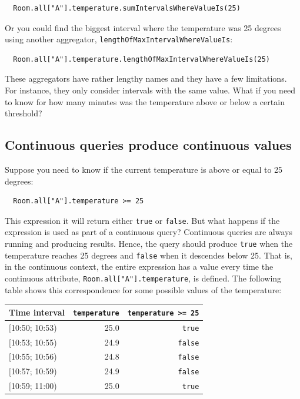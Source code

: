 \documentclass{report}
\begin{document}
\begin{lstlisting}
  Room.all["A"].temperature.sumIntervalsWhereValueIs(25)
\end{lstlisting}

Or you could find the biggest interval where the temperature was 25
degrees using another aggregator,
\verb=lengthOfMaxIntervalWhereValueIs=:

\begin{lstlisting}
  Room.all["A"].temperature.lengthOfMaxIntervalWhereValueIs(25)
\end{lstlisting}

These aggregators have rather lengthy names and they have a few
limitations. For instance, they only consider intervals with the same
value. What if you need to know for how many minutes was the
temperature above or below a certain threshold?

\subsection{Continuous queries produce continuous values}

Suppose you need to know if the current temperature is above or equal
to 25 degrees:

\begin{lstlisting}
  Room.all["A"].temperature >= 25
\end{lstlisting}

This expression it will return either \verb=true= or \verb=false=. But
what happens if the expression is used as part of a continuous query?
Continuous queries are always running and producing results. Hence,
the query should produce \verb=true= when the temperature reaches 25
degrees and \verb=false= when it descendes below 25. That is, in the
continuous context, the entire expression has a value every time the
continuous attribute, \verb=Room.all["A"].temperature=, is
defined. The following table shows this correspondence for some
possible values of the temperature:

\begin{tabular}{ |l|r|r| }
  \hline
  Time interval & \verb=temperature= & \verb!temperature >= 25! \\
  \hline
  $[$10:50; 10:53) & 25.0 & \verb=true=  \\
  $[$10:53; 10:55) & 24.9 & \verb=false= \\
  $[$10:55; 10:56) & 24.8 & \verb=false= \\
  $[$10:57; 10:59) & 24.9 & \verb=false= \\
  $[$10:59; 11:00) & 25.0 & \verb=true=  \\
  \hline
\end{tabular}
\end{document}

